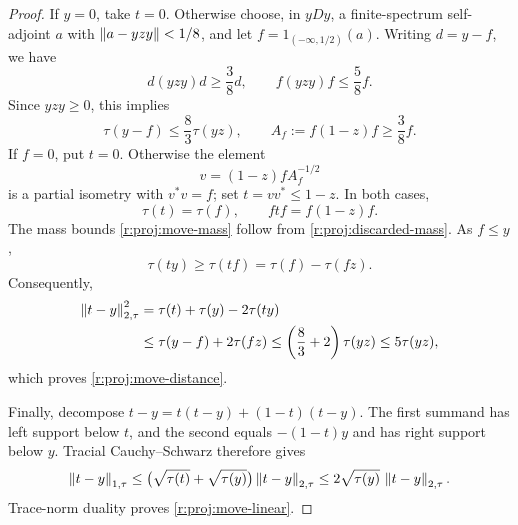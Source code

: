 \begin{proof}
If $y=0$, take $t=0$.  Otherwise choose, in $yDy$, a finite-spectrum
self-adjoint $a$ with $\lVert a-yzy\rVert<1/8$, and let
$f=1_{(-\infty,1/2)}(a)$.  Writing $d=y-f$, we have
\[
  d(yzy)d\ge\frac38d,
  \qquad f(yzy)f\le\frac58f.
\]
Since $yzy\ge0$, this implies
\begin{equation}\label{r:proj:discarded-mass}
  \tau(y-f)\le\frac83\tau(yz),
  \qquad A_f:=f(1-z)f\ge\frac38f.
\end{equation}
If $f=0$, put $t=0$.  Otherwise the element
\[
  v=(1-z)f A_f^{-1/2}
\]
is a partial isometry with $v^*v=f$; set $t=vv^*\le1-z$.
In both cases,
\[
  \tau(t)=\tau(f),\qquad ftf=f(1-z)f.
\]
The mass bounds \eqref{r:proj:move-mass} follow from
\eqref{r:proj:discarded-mass}.  As $f\le y$,
\[
  \tau(ty)\ge\tau(tf)=\tau(f)-\tau(fz).
\]
Consequently,
\begin{align*}
  \left\|t-y\right\|_{2,\tau}^{2}
   &=\tau(t)+\tau(y)-2\tau(ty)\\
   &\le\tau(y-f)+2\tau(fz)
    \le\left(\frac83+2\right)\tau(yz)
    \le5\tau(yz),
\end{align*}
which proves \eqref{r:proj:move-distance}.

Finally, decompose $t-y=t(t-y)+(1-t)(t-y)$.  The first summand has left
support below $t$, and the second equals $-(1-t)y$ and has right support
below $y$.  Tracial Cauchy--Schwarz therefore gives
\[
  \left\|t-y\right\|_{1,\tau}
   \le\bigl(\sqrt{\tau(t)}+\sqrt{\tau(y)}\bigr)
       \left\|t-y\right\|_{2,\tau}
   \le2\sqrt{\tau(y)}\,\left\|t-y\right\|_{2,\tau}.
\]
Trace-norm duality proves \eqref{r:proj:move-linear}.
\end{proof}
